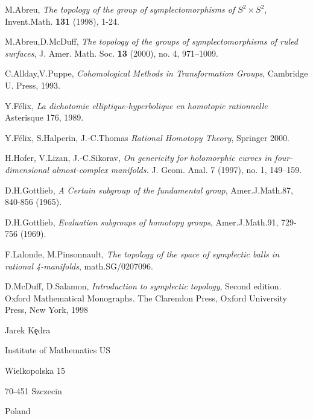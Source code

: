 \documentclass[a4paper,14pt]{article}
\newcommand{\BS}{{\bigskip}}
\numberwithin{equation}{section}
\numberwithin{figure}{section}
\begin{document}
\begin{thebibliography}{cccccccc}


M.Abreu, 
{\it  The topology of the group of symplectomorphisms of
$S^2\times S^2$},
Invent.Math. {\bf 131} (1998), 1-24.


M.Abreu,D.McDuff, 
{\it The topology of the groups of symplectomorphisms
of ruled surfaces}, 
J. Amer. Math. Soc. {\bf 13} (2000), no. 4, 971--1009.






    C.Allday,V.Puppe, {\it Cohomological Methods in Transformation
    Groups}, Cambridge U. Press, 1993.

       

 Y.F\'elix, {\it La dichotomie elliptique-hyperbolique en
                 homotopie rationnelle} Asterisque 176, 1989.


Y.F\'elix, S.Halperin, J.-C.Thomas {\it
                  Rational Homotopy Theory}, Springer 2000.


H.Hofer, V.Lizan, J.-C.Sikorav, {\it 
On genericity for holomorphic curves in four-dimensional almost-complex manifolds.} 
J. Geom. Anal. 7 (1997), no. 1, 149--159.     



     D.H.Gottlieb, {\it A Certain subgroup of the fundamental group},
Amer.J.Math.87, 840-856 (1965).


     D.H.Gottlieb, {\it Evaluation subgroups of homotopy groups},
Amer.J.Math.91, 729-756 (1969).




F.Lalonde, M.Pinsonnault,
{\it The topology of the space of symplectic balls in rational 4-manifolds},
math.SG/0207096.





D.McDuff, D.Salamon,
{\it Introduction to symplectic topology}, Second edition. 
Oxford Mathematical Monographs. The Clarendon Press, Oxford University Press, New York, 1998



 

\end{thebibliography}


\BS
\BS

Jarek K\c edra

Institute of Mathematics US

Wielkopolska 15

70-451 Szczecin

Poland
\end{document}
